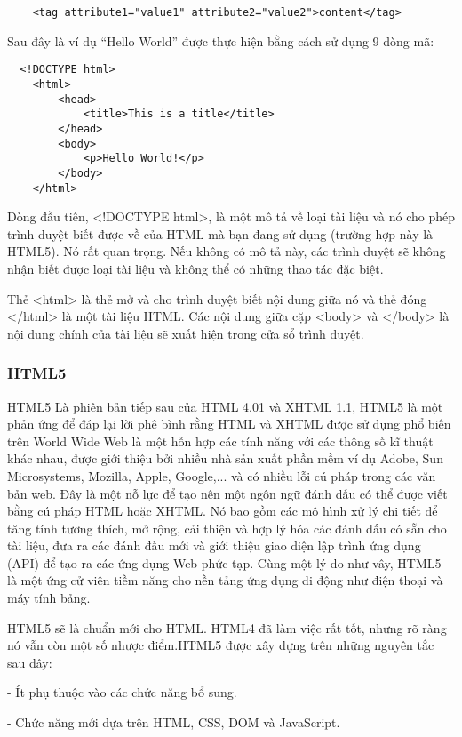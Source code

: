\begin{lstlisting}
	<tag attribute1="value1" attribute2="value2">content</tag>
\end{lstlisting}

Sau đây là ví dụ “Hello World” được thực hiện bằng cách sử dụng 9 dòng mã:

\begin{lstlisting}
  <!DOCTYPE html>
	<html>
   		<head>
     		<title>This is a title</title>
   		</head>
   		<body>
   			<p>Hello World!</p>
   		</body>
 	</html>
\end{lstlisting}


Dòng đầu tiên, <!DOCTYPE html>, là một mô tả về loại tài liệu và nó cho phép trình duyệt biết được về của HTML mà bạn đang sử dụng (trường hợp này là HTML5). Nó rất quan trọng. Nếu không có mô tả này, các trình duyệt sẽ không nhận biết được loại tài liệu và không thể có những thao tác đặc biệt.

Thẻ <html> là thẻ mở và cho trình duyệt biết nội dung giữa nó và thẻ đóng </html> là một tài liệu HTML. Các nội dung giữa cặp <body> và </body> là nội dung chính của tài liệu sẽ xuất hiện trong cửa sổ trình duyệt.


\subsubsection{HTML5}
HTML5 Là phiên bản tiếp sau của HTML 4.01 và XHTML 1.1, HTML5 là một phản ứng để đáp lại lời phê bình rằng HTML và XHTML được sử dụng phổ biến trên World Wide Web là một hỗn hợp các tính năng với các thông số kĩ thuật khác nhau, được giới thiệu bởi nhiều nhà sản xuất phần mềm ví dụ Adobe, Sun Microsystems, Mozilla, Apple, Google,... và có nhiều lỗi cú pháp trong các văn bản web. Đây là một nỗ lực để tạo nên một ngôn ngữ đánh dấu có thể được viết bằng cú pháp HTML hoặc XHTML. Nó bao gồm các mô hình xử lý chi tiết để tăng tính tương thích, mở rộng, cải thiện và hợp lý hóa các đánh dấu có sẵn cho tài liệu, đưa ra các đánh đấu mới và giới thiệu giao diện lập trình ứng dụng (API) để tạo ra các ứng dụng Web phức tạp. Cùng một lý do như vây, HTML5 là một ứng cử viên tiềm năng cho nền tảng ứng dụng di động như điện thoại và máy tính bảng.

HTML5 sẽ là chuẩn mới cho HTML. HTML4 đã làm việc rất tốt, nhưng rõ ràng nó vẫn còn một số nhược điểm.HTML5 được xây dựng trên những nguyên tắc sau đây:

\quad - Ít phụ thuộc vào các chức năng bổ sung.

\quad - Chức năng mới dựa trên HTML, CSS, DOM và JavaScript.

